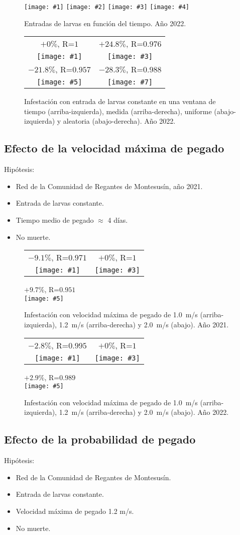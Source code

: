 \documentclass[review,authoryear]{elsarticle}
\newcommand{\FIGIIIB}[8]
{
	\begin{figure}[ht!]
		\centering
		\begin{tabular}{cc}
			#2&#4\\
			\texttt{[image: \#1]}&
			\texttt{[image: \#3]}\\
		\end{tabular}
		#6\\
		\texttt{[image: \#5]}
		\caption{#7.\label{#8}}
	\end{figure}
}
\newcommand{\FIGIV}[6]
{
	\begin{figure}[ht!]
		\centering
		\texttt{[image: \#1]}
		\texttt{[image: \#2]}
		\texttt{[image: \#3]}
		\texttt{[image: \#4]}
		\caption{#5.\label{#6}}
	\end{figure}
}
\newcommand{\FIGIVB}[9]
{
	\begin{figure}[ht!]
		\centering
		\begin{tabular}{cc}
			#2&#4\\
			\texttt{[image: \#1]}&
			\texttt{[image: \#3]}\\
			#6&#8\\
			\texttt{[image: \#5]}&
			\texttt{[image: \#7]}
		\end{tabular}
		\caption{#9.}
	\end{figure}
}
\begin{document}
\FIGIV{2022-mussel-input-constant.eps}
{2022-mussel-input-measured.eps}
{2022-mussel-input-uniform.eps}
{2022-mussel-input-random.eps}
{Entradas de larvas en función del tiempo. Año 2022}{Fig2022MusselInput}

\FIGIVB{2022-mussel-constant.pdf}{$+0\%$, R=$1$}
{2022-mussel-measured.pdf}{$+24.8\%$, R=$0.976$}
{2022-mussel-uniform.pdf}{$-21.8\%$, R=$0.957$}
{2022-mussel-random.pdf}{$-28.3\%$, R=$0.988$}
{Infestación con entrada de larvas constante en una ventana de tiempo
(arriba-izquierda), medida (arriba-derecha), uniforme (abajo-izquierda) y
aleatoria (abajo-derecha). Año 2022\label{Fig2022MusselRandom}}

\clearpage
\subsection{Efecto de la velocidad máxima de pegado}

Hipótesis:
\begin{itemize}
\item Red de la Comunidad de Regantes de Montesusín, año 2021.
\item Entrada de larvas constante.
\item Tiempo medio de pegado $\approx$ 4 días.
\item No muerte.
\end{itemize}

\FIGIIIB{2021-mussel-velocity-1.0.pdf}{$-9.1\%$, R=$0.971$}
{2021-mussel-constant.pdf}{$+0\%$, R=$1$}
{2021-mussel-velocity-2.0.pdf}{$+9.7\%$, R=$0.951$}
{Infestación con velocidad máxima de pegado de
1.0~m/s (arriba-izquierda), 1.2~m/s (arriba-derecha) y 2.0~m/s (abajo). Año
2021}{Fig2021MusselVelocity}

\FIGIIIB{2022-mussel-velocity-1.0.pdf}{$-2.8\%$, R=$0.995$}
{2022-mussel-constant.pdf}{$+0\%$, R=$1$}
{2022-mussel-velocity-2.0.pdf}{$+2.9\%$, R=$0.989$}
{Infestación con velocidad máxima de pegado de
1.0~m/s (arriba-izquierda), 1.2~m/s (arriba-derecha) y 2.0~m/s (abajo). Año
2022}{Fig2022MusselVelocity}

\clearpage
\subsection{Efecto de la probabilidad de pegado}

Hipótesis:
\begin{itemize}
\item Red de la Comunidad de Regantes de Montesusín.
\item Entrada de larvas constante.
\item Velocidad máxima de pegado 1.2 m/s.
\item No muerte.
\end{itemize}
\end{document}

